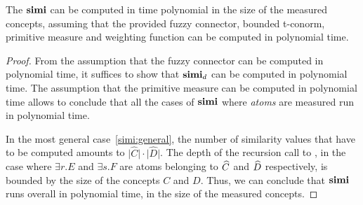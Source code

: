   \begin{proposition}
    The \csm \(\mathbf{simi}\) can be computed in time polynomial in the size of the measured concepts, assuming that the provided fuzzy connector, bounded t-conorm, primitive measure and weighting function can be computed in polynomial time. 
  \end{proposition}
  \begin{proof}
    From the assumption that the fuzzy connector can be computed in polynomial time, it suffices to show that \(\mathbf{simi}_d\) can be computed in polynomial time.
    The assumption that the primitive measure can be computed in polynomial time allows to conclude that all the cases of \(\mathbf{simi}\) where \emph{atoms} are measured run in polynomial time.

    In the most general case~\eqref{simi:general}, the number of similarity values that have to be computed amounts to \(\lvert \widehat{C} \rvert \cdot \lvert \widehat{D} \rvert\).
    The depth of the recursion call to \simi, in the case where \(\exists{}r.E\) and \(\exists{}s.F\) are atoms belonging to \(\widehat{C}\) and \(\widehat{D}\) respectively, is bounded by the size of the concepts \(C\) and \(D\).
    Thus, we can conclude that \(\mathbf{simi}\) runs overall in polynomial time, in the size of the measured concepts.
  \end{proof}

